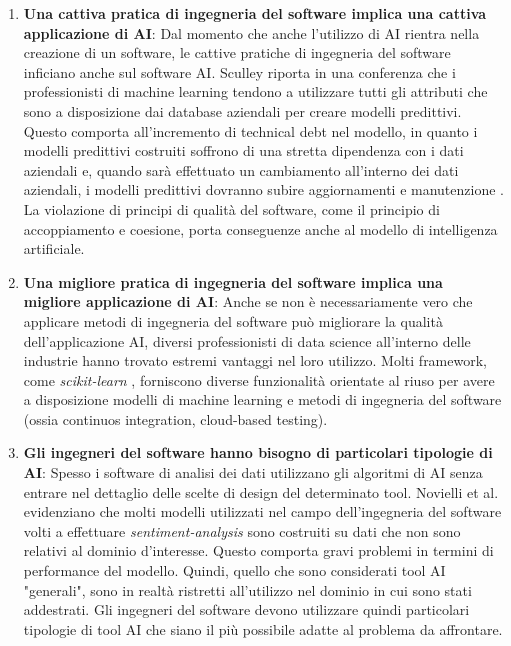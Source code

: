 \begin{enumerate}
    \item \textbf{Una cattiva pratica di ingegneria del software implica una cattiva applicazione di AI}: Dal momento che anche l'utilizzo di AI rientra nella creazione di un software, le cattive pratiche di ingegneria del software inficiano anche sul software AI. Sculley riporta in una conferenza che i professionisti di machine learning tendono a utilizzare tutti gli attributi che sono a disposizione dai database aziendali per creare modelli predittivi. Questo comporta all'incremento di technical debt nel modello, in quanto i modelli predittivi costruiti soffrono di una stretta dipendenza con i dati aziendali e, quando sarà effettuato un cambiamento all'interno dei dati aziendali, i modelli predittivi dovranno subire aggiornamenti e manutenzione \cite{SculleyYoutube}. La violazione di principi di qualità del software, come il principio di accoppiamento e coesione, porta conseguenze anche al modello di intelligenza artificiale.
    \item \textbf{Una migliore pratica di ingegneria del software implica una migliore applicazione di AI}: Anche se non è necessariamente vero che applicare metodi di ingegneria del software può migliorare la qualità dell'applicazione AI, diversi professionisti di data science all'interno delle industrie hanno trovato estremi vantaggi nel loro utilizzo. Molti framework, come \textit{scikit-learn} \cite{scikitdoc}, forniscono diverse funzionalità orientate al riuso per avere a disposizione modelli di machine learning e metodi di ingegneria del software (ossia continuos integration, cloud-based testing).
    \item \textbf{Gli ingegneri del software hanno bisogno di particolari tipologie di AI}: Spesso i software di analisi dei dati utilizzano gli algoritmi di AI senza entrare nel dettaglio delle scelte di design del determinato tool. Novielli et al. \cite{NovielliNLP} evidenziano che molti modelli utilizzati nel campo dell'ingegneria del software volti a effettuare \textit{sentiment-analysis} sono costruiti su dati che non sono relativi al dominio d'interesse.
    Questo comporta gravi problemi in termini di performance del modello.
    Quindi, quello che sono considerati tool AI "generali", sono in realtà ristretti all'utilizzo nel dominio in cui sono stati addestrati. Gli ingegneri del software devono utilizzare quindi particolari tipologie di tool AI che siano il più possibile adatte al problema da affrontare.
    
\end{enumerate}


